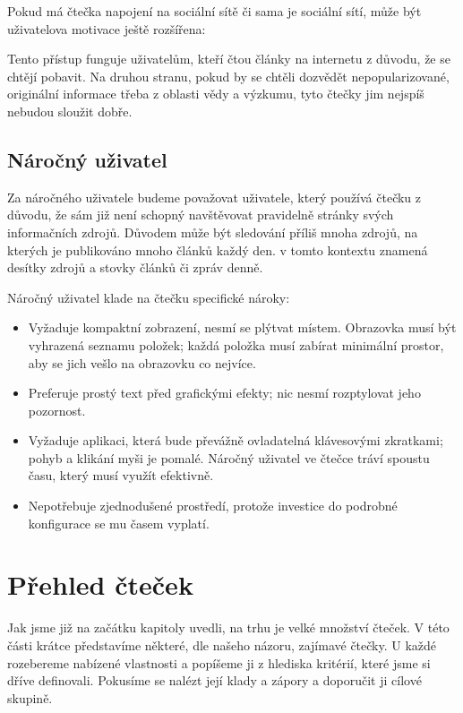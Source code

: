 Pokud má čtečka napojení na sociální sítě či sama je sociální sítí, může být uživatelova motivace ještě rozšířena:

Tento přístup funguje uživatelům, kteří čtou články na internetu z důvodu, že se chtějí pobavit.
Na druhou stranu, pokud by se chtěli dozvědět nepopularizované, originální informace třeba z oblasti vědy a výzkumu, tyto čtečky jim nejspíš nebudou sloužit dobře.

\subsection{Náročný uživatel}\label{ssec:narocny-uzivatel}

Za náročného uživatele budeme považovat uživatele, který používá čtečku z důvodu, že sám již není schopný navštěvovat pravidelně stránky svých informačních zdrojů.
Důvodem může být sledování příliš mnoha zdrojů, na kterých je publikováno mnoho článků každý den.
 v tomto kontextu znamená desítky zdrojů a stovky článků či zpráv denně.

Náročný uživatel klade na čtečku specifické nároky:
\begin{itemize}
    \item Vyžaduje kompaktní zobrazení, nesmí se plýtvat místem.
        Obrazovka musí být vyhrazená seznamu položek; každá položka musí zabírat minimální prostor, aby se jich vešlo na obrazovku co nejvíce.
    \item Preferuje prostý text před grafickými efekty; nic nesmí rozptylovat jeho pozornost.
    \item Vyžaduje aplikaci, která bude převážně ovladatelná klávesovými zkratkami; pohyb a klikání myši je pomalé.
        Náročný uživatel ve čtečce tráví spoustu času, který musí využít efektivně.
    \item Nepotřebuje zjednodušené prostředí, protože investice do podrobné konfigurace se mu časem vyplatí.
\end{itemize}

\section{Přehled čteček}

Jak jsme již na začátku kapitoly uvedli, na trhu je velké množství čteček.
V této části krátce představíme některé, dle našeho názoru, zajímavé čtečky.
U každé rozebereme nabízené vlastnosti a popíšeme ji z hlediska kritérií, které jsme si dříve definovali.
Pokusíme se nalézt její klady a zápory a doporučit ji cílové skupině.

